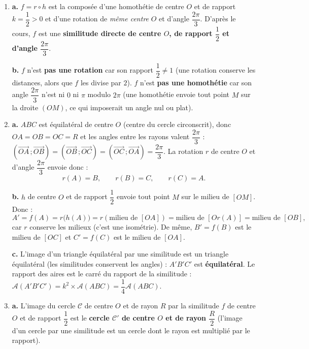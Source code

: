 \documentclass[11pt]{article}
\begin{document}
\begin{corrige}
\begin{enumerate}
\item \textbf{a.} $f = r \circ h$ est la composée d'une homothétie de centre $O$ et de rapport $k = \dfrac{1}{2} > 0$ et d'une rotation de \emph{même centre} $O$ et d'angle $\dfrac{2\pi}{3}$. D'après le cours, $f$ est une \textbf{similitude directe de centre $O$, de rapport $\dfrac{1}{2}$ et d'angle $\dfrac{2\pi}{3}$}.

\textbf{b.} $f$ n'est \textbf{pas une rotation} car son rapport $\dfrac{1}{2} \neq 1$ (une rotation conserve les distances, alors que $f$ les divise par $2$). $f$ n'est \textbf{pas une homothétie} car son angle $\dfrac{2\pi}{3}$ n'est ni $0$ ni $\pi$ modulo $2\pi$ (une homothétie envoie tout point $M$ sur la droite $(OM)$, ce qui imposerait un angle nul ou plat).

\item \textbf{a.} $ABC$ est équilatéral de centre $O$ (centre du cercle circonscrit), donc $OA = OB = OC = R$ et les angles entre les rayons valent $\dfrac{2\pi}{3}$ : $\left(\overrightarrow{OA}\,;\overrightarrow{OB}\right) = \left(\overrightarrow{OB}\,;\overrightarrow{OC}\right) = \left(\overrightarrow{OC}\,;\overrightarrow{OA}\right) = \dfrac{2\pi}{3}$. La rotation $r$ de centre $O$ et d'angle $\dfrac{2\pi}{3}$ envoie donc :
\[ r(A) = B, \qquad r(B) = C, \qquad r(C) = A. \]

\textbf{b.} $h$ de centre $O$ et de rapport $\dfrac{1}{2}$ envoie tout point $M$ sur le milieu de $[OM]$. Donc :
\[ A' = f(A) = r\big(h(A)\big) = r(\text{milieu de } [OA]) = \text{milieu de } [Or(A)] = \text{milieu de } [OB], \]
car $r$ conserve les milieux (c'est une isométrie). De même, $B' = f(B)$ est le milieu de $[OC]$ et $C' = f(C)$ est le milieu de $[OA]$.

\textbf{c.} L'image d'un triangle équilatéral par une similitude est un triangle équilatéral (les similitudes conservent les angles) : $A'B'C'$ est \textbf{équilatéral}. Le rapport des aires est le carré du rapport de la similitude : $\mathcal{A}(A'B'C') = k^2 \times \mathcal{A}(ABC) = \dfrac{1}{4}\mathcal{A}(ABC)$.

\item \textbf{a.} L'image du cercle $\mathcal{C}$ de centre $O$ et de rayon $R$ par la similitude $f$ de centre $O$ et de rapport $\dfrac{1}{2}$ est le \textbf{cercle $\mathcal{C}'$ de centre $O$ et de rayon $\dfrac{R}{2}$} (l'image d'un cercle par une similitude est un cercle dont le rayon est multiplié par le rapport).


\end{enumerate}
\end{corrige}
\end{document}
